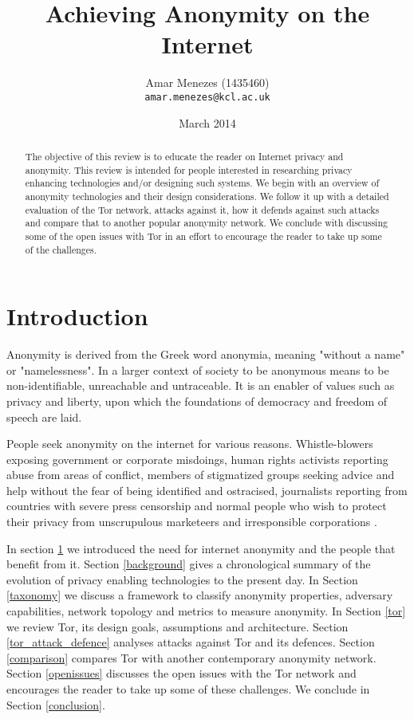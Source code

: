 \documentclass{llncs}
\begin{document}
\author{Amar Menezes (1435460)\\
\texttt{amar.menezes@kcl.ac.uk}}
\title{Achieving Anonymity on the Internet}
\date{March 2014}
\maketitle

\begin{abstract} 
	The objective of this review is to educate the reader on Internet privacy and anonymity. This review is intended for people interested in researching privacy enhancing technologies and/or designing such systems. We begin with an overview of anonymity technologies and their design considerations. We follow it up with a detailed evaluation of the Tor network, attacks against it, how it defends against such attacks and compare that to another popular anonymity network. We conclude with discussing some of the open issues with Tor in an effort to encourage the reader to take up some of the challenges. 
\end{abstract}

\section{Introduction} \label{intro}
Anonymity is derived from the Greek word anonymia, meaning "without a name" or "namelessness". In a larger context of society to be anonymous means to be non-identifiable, unreachable and untraceable. It is an enabler of values such as privacy and liberty, upon which the foundations of democracy and freedom of speech are laid.

People seek anonymity on the internet for various reasons. Whistle-blowers exposing government or corporate misdoings, human rights activists reporting abuse from areas of conflict, members of stigmatized groups seeking advice and help without the fear of being identified and ostracised, journalists reporting from countries with severe press censorship and normal people who wish to protect their privacy from unscrupulous marketeers and irresponsible corporations \cite{seekanonymity}.

In section \ref{intro} we introduced the need for internet anonymity and the people that benefit from it. Section \ref{background} gives a chronological summary of the evolution of privacy enabling technologies to the present day. In Section \ref{taxonomy} we discuss a framework to classify anonymity properties, adversary capabilities, network topology and metrics to measure anonymity. 
In Section \ref{tor} we review Tor, its design goals, assumptions and architecture. Section \ref{tor_attack_defence} analyses attacks against Tor and its defences. Section \ref{comparison} compares Tor with another contemporary anonymity network. Section \ref{openissues} discusses the open issues with the Tor network and encourages the reader to take up some of these challenges. We conclude in Section \ref{conclusion}.
\end{document}
